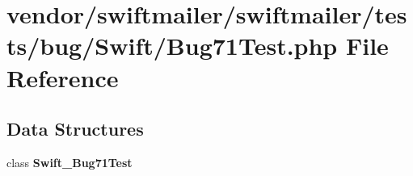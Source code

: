 \section{vendor/swiftmailer/swiftmailer/tests/bug/\+Swift/\+Bug71\+Test.php File Reference}
\label{_bug71_test_8php}
\subsection*{Data Structures}
\begin{DoxyCompactItemize}
\item 
class {\bf Swift\+\_\+\+Bug71\+Test}
\end{DoxyCompactItemize}
